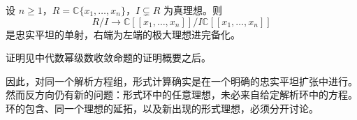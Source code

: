 \begin{proposition}\label{b3:prop:analytic-formal-quotient-comparison}
	设 \(n\ge1\)，\(R=\mathbb C\{x_1,\ldots,x_n\}\)，\(I\subsetneq R\) 为真理想。则
	\[
		R/I\longrightarrow\mathbb C[\![x_1,\ldots,x_n]\!]/I\mathbb C[\![x_1,\ldots,x_n]\!]
	\]
	是忠实平坦的单射，右端为左端的极大理想进完备化。
\end{proposition}
证明见中代数幂级数收敛命题的证明概要之后。

因此，对同一个解析方程组，形式计算确实是在一个明确的忠实平坦扩张中进行。然而反方向仍有新的问题：形式环中的任意理想，未必来自给定解析环中的方程。环的包含、同一个理想的延拓，以及新出现的形式理想，必须分开讨论。
